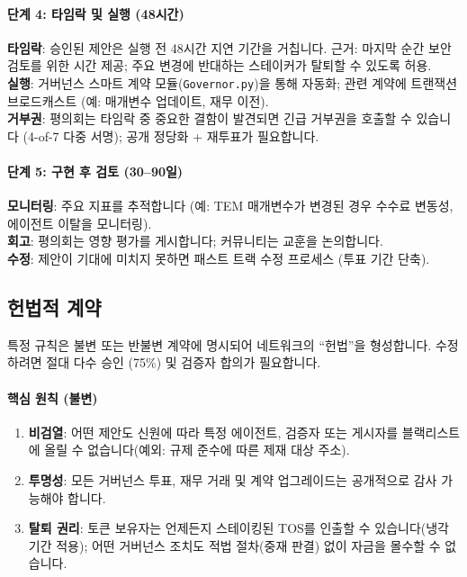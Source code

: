 \documentclass[11pt]{article}
\begin{document}
\paragraph{단계 4: 타임락 및 실행 (48시간)}
\textbf{타임락}: 승인된 제안은 실행 전 48시간 지연 기간을 거칩니다. 근거: 마지막 순간 보안 검토를 위한 시간 제공; 주요 변경에 반대하는 스테이커가 탈퇴할 수 있도록 허용.\\
\textbf{실행}: 거버넌스 스마트 계약 모듈(\texttt{Governor.py})을 통해 자동화; 관련 계약에 트랜잭션 브로드캐스트 (예: 매개변수 업데이트, 재무 이전).\\
\textbf{거부권}: 평의회는 타임락 중 중요한 결함이 발견되면 긴급 거부권을 호출할 수 있습니다 (4-of-7 다중 서명); 공개 정당화 + 재투표가 필요합니다.

\paragraph{단계 5: 구현 후 검토 (30--90일)}
\textbf{모니터링}: 주요 지표를 추적합니다 (예: TEM 매개변수가 변경된 경우 수수료 변동성, 에이전트 이탈을 모니터링).\\
\textbf{회고}: 평의회는 영향 평가를 게시합니다; 커뮤니티는 교훈을 논의합니다.\\
\textbf{수정}: 제안이 기대에 미치지 못하면 패스트 트랙 수정 프로세스 (투표 기간 단축).

\subsection{헌법적 계약}

특정 규칙은 불변 또는 반불변 계약에 명시되어 네트워크의 ``헌법''을 형성합니다. 수정하려면 절대 다수 승인 (75\%) 및 검증자 합의가 필요합니다.

\paragraph{핵심 원칙 (불변)}
\begin{enumerate}[noitemsep]
  \item \textbf{비검열}: 어떤 제안도 신원에 따라 특정 에이전트, 검증자 또는 게시자를 블랙리스트에 올릴 수 없습니다(예외: 규제 준수에 따른 제재 대상 주소).
  \item \textbf{투명성}: 모든 거버넌스 투표, 재무 거래 및 계약 업그레이드는 공개적으로 감사 가능해야 합니다.
  \item \textbf{탈퇴 권리}: 토큰 보유자는 언제든지 스테이킹된 TOS를 인출할 수 있습니다(냉각 기간 적용); 어떤 거버넌스 조치도 적법 절차(중재 판결) 없이 자금을 몰수할 수 없습니다.
\end{enumerate}
\end{document}
